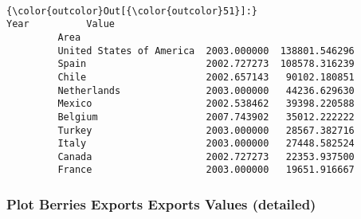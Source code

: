 \documentclass[11pt]{article}
\begin{document}
    \begin{center}
    \end{center}
    { \hspace*{\fill} \\}
    
\begin{Verbatim}[commandchars=\\\{\}]
{\color{outcolor}Out[{\color{outcolor}51}]:}                                  Year          Value
         Area                                                
         United States of America  2003.000000  138801.546296
         Spain                     2002.727273  108578.316239
         Chile                     2002.657143   90102.180851
         Netherlands               2003.000000   44236.629630
         Mexico                    2002.538462   39398.220588
         Belgium                   2007.743902   35012.222222
         Turkey                    2003.000000   28567.382716
         Italy                     2003.000000   27448.582524
         Canada                    2002.727273   22353.937500
         France                    2003.000000   19651.916667
\end{Verbatim}
            
    \subsubsection{Plot Berries Exports Exports Values
(detailed)}\label{plot-berries-exports-exports-values-detailed}
\end{document}
